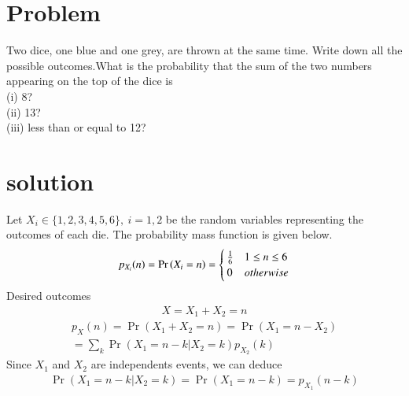 \documentclass[journal,12pt,twocolumn]{IEEEtran}
\begin{document}
\section{Problem}
Two dice, one blue and one grey, are thrown at the same time. Write down all the possible outcomes.What is the probability that the sum of the two numbers appearing on the top of the dice is\\
(i) 8?\\
(ii) 13?\\
(iii) less than or equal to 12?
\section{solution}

Let $X_i \in \{1,2,3,4,5,6\},\ i=1,2$ be the random variables representing the outcomes of each die.
The probability mass function is given below.
\begin{align}
\label{eq:outcomes}
p_{X_i}(n) = \Pr\left(X_i = n\right) = 
\begin{cases}
\frac{1}{6} & 1 \le n \le 6
\\
0 & otherwise
\end{cases}
\end{align}
Desired outcomes
\begin{align}
X=X_1+X_2=n
\end{align}
\begin{align}
	p_X(n)=\Pr{(X_1+X_2=n)}=\Pr{(X_1=n-X_2)}\\
	=\displaystyle \sum_k \Pr{(X_1=n-k|X_2=k)}p_{X_2}(k) \label{eq:sum}
\end{align}
Since $X_1$ and $X_2$ are independents events, we can deduce
\begin{align}
\Pr{(X_1=n-k|X_2=k)}=\Pr{(X_1=n-k)}=p_{X_1}(n-k)
\label{eq:independent}
\end{align}
\end{document}
